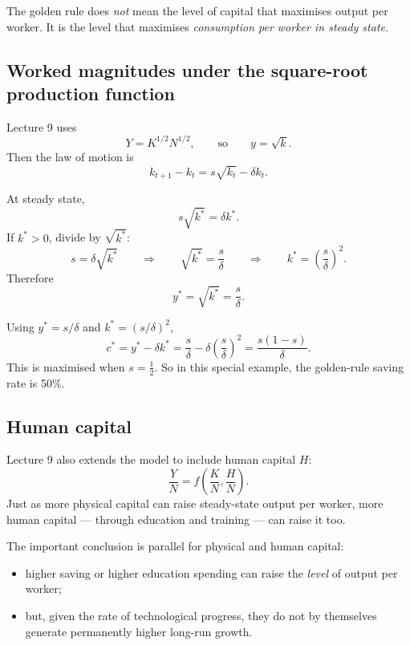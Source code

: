 \documentclass[12pt]{article}
\begin{document}
\begin{commonmistake}
The golden rule does \emph{not} mean the level of capital that maximises output per worker. It is the level that maximises \emph{consumption per worker in steady state}.
\end{commonmistake}

\subsection{Worked magnitudes under the square-root production function}

Lecture 9 uses
\[
Y=K^{1/2}N^{1/2},
\qquad\text{so}\qquad
y=\sqrt{k}.
\]
Then the law of motion is
\[
k_{t+1}-k_t=s\sqrt{k_t}-\delta k_t.
\]

At steady state,
\[
s\sqrt{k^*}=\delta k^*.
\]
If $k^*>0$, divide by $\sqrt{k^*}$:
\[
s=\delta \sqrt{k^*}
\qquad\Rightarrow\qquad
\sqrt{k^*}=\frac{s}{\delta}
\qquad\Rightarrow\qquad
k^*=\left(\frac{s}{\delta}\right)^2.
\]
Therefore
\[
y^*=\sqrt{k^*}=\frac{s}{\delta}.
\]

\begin{examplebox}[title={Worked Example: Consumption and the golden rule in the square-root case}]
Using $y^*=s/\delta$ and $k^*=(s/\delta)^2$,
\[
c^*=y^*-\delta k^*
=\frac{s}{\delta}-\delta\left(\frac{s}{\delta}\right)^2
=\frac{s(1-s)}{\delta}.
\]
This is maximised when $s=\tfrac12$. So in this special example, the golden-rule saving rate is 50\%.
\end{examplebox}

\subsection{Human capital}

Lecture 9 also extends the model to include human capital $H$:
\[
\frac{Y}{N}=f\!\left(\frac{K}{N},\frac{H}{N}\right).
\]
Just as more physical capital can raise steady-state output per worker, more human capital --- through education and training --- can raise it too.

\begin{policynote}
The important conclusion is parallel for physical and human capital:
\begin{itemize}[leftmargin=1.5em]
\item higher saving or higher education spending can raise the \emph{level} of output per worker;
\item but, given the rate of technological progress, they do not by themselves generate permanently higher long-run growth.
\end{itemize}
\end{policynote}
\end{document}

